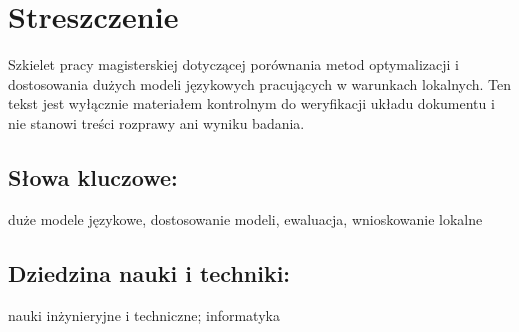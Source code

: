 \chapter*{Streszczenie}

Szkielet pracy magisterskiej dotyczącej porównania metod optymalizacji i dostosowania dużych modeli językowych pracujących w warunkach lokalnych. Ten tekst jest wyłącznie materiałem kontrolnym do weryfikacji układu dokumentu i nie stanowi treści rozprawy ani wyniku badania.

\section*{Słowa kluczowe:}
\noindent duże modele językowe, dostosowanie modeli, ewaluacja, wnioskowanie lokalne

\section*{Dziedzina nauki i techniki:}
\noindent nauki inżynieryjne i techniczne; informatyka
